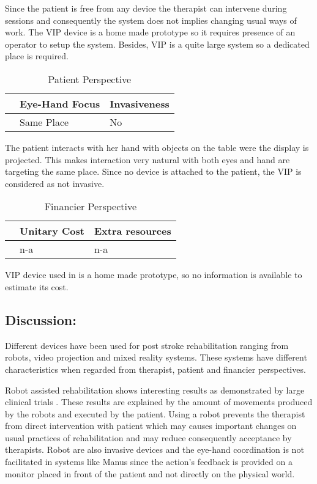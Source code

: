 \documentclass[preprint,authoryear,12pt]{elsarticle}
\begin{document}
Since the patient is free from any device the therapist can intervene during sessions and consequently the system does not implies changing usual ways of work. The VIP device is a home made prototype so it requires presence of an operator to setup the system. Besides, VIP is a quite large system so a dedicated place is required.

\begin{table}[h]
\caption{Patient Perspective}
\center
\label{tab:pataper}
\begin{tabular}{|l|l|l|}
\hline
& Eye-Hand  Focus & Invasiveness \\
\hline
\citep{AlMahmud2008} & Same Place &  No\\
\hline
\end{tabular}
\end{table}

The patient interacts with her hand with objects on the table were the display is projected. This makes interaction very natural with both eyes and hand are targeting the same place. Since no device is attached to the patient, the VIP is considered as not invasive.

\begin{table}[h]
\caption{Financier Perspective}
\center
\label{tab:finaper}
\begin{tabular}{|l|l|l|}
\hline
& Unitary Cost & Extra resources \\
\hline
\citep{AlMahmud2008} & n-a &  n-a\\
\hline
\end{tabular}
\end{table}

VIP device used in \citep{AlMahmud2008} is a home made prototype, so no information is available to estimate its cost.

\subsection{Discussion:}  

Different devices have been used for post stroke rehabilitation ranging from robots, video projection and mixed reality systems. These systems have different characteristics when regarded from therapist, patient and financier perspectives.

Robot assisted rehabilitation shows interesting results as demonstrated by large clinical trials \citep{LoAlbertC2010}. These results are explained by the amount of movements produced by the robots and executed by the patient.
Using a robot prevents the therapist from direct intervention with patient which may causes important changes on usual practices of rehabilitation and may reduce consequently acceptance by therapists. Robot are also invasive devices and the eye-hand coordination is not facilitated in systems like Manus since the action's feedback is provided on a monitor placed in front of the patient and not directly on the physical world.  
\end{document}
